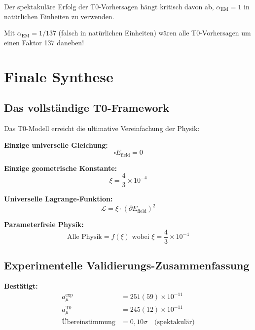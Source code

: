 \documentclass[12pt,a4paper]{report}
\begin{document}
	\begin{tcolorbox}[colback=green!10!white,colframe=green!75!black,title=T0-ERFOLG ERKLÄRT]
		Der spektakuläre Erfolg der T0-Vorhersagen hängt kritisch davon ab, $\alpha_{\text{EM}} = 1$ in natürlichen Einheiten zu verwenden.
		
		Mit $\alpha_{\text{EM}} = 1/137$ (falsch in natürlichen Einheiten) wären alle T0-Vorhersagen um einen Faktor 137 daneben!
	\end{tcolorbox}
	
	\section{Finale Synthese}
	\label{sec:final_synthesis}
	
	\subsection{Das vollständige T0-Framework}
	\label{subsec:complete_framework}
	
	Das T0-Modell erreicht die ultimative Vereinfachung der Physik:
	
	\textbf{Einzige universelle Gleichung:}
	\begin{equation}
		\square E_{\text{field}} = 0
	\end{equation}
	
	\textbf{Einzige geometrische Konstante:}
	\begin{equation}
		\xi = \frac{4}{3} \times 10^{-4}
	\end{equation}
	
	\textbf{Universelle Lagrange-Funktion:}
	\begin{equation}
		\mathcal{L} = \xi \cdot (\partial E_{\text{field}})^2
	\end{equation}
	
	\textbf{Parameterfreie Physik:}
	\begin{equation}
		\boxed{\text{Alle Physik} = f(\xi) \text{ wobei } \xi = \frac{4}{3} \times 10^{-4}}
	\end{equation}
	
	\subsection{Experimentelle Validierungs-Zusammenfassung}
	\label{subsec:experimental_summary}
	
	\textbf{Bestätigt:}
	\begin{align}
		a_\mu^{\text{exp}} &= 251(59) \times 10^{-11} \\
		a_\mu^{\text{T0}} &= 245(12) \times 10^{-11} \\
		\text{Übereinstimmung} &= 0,10\sigma \quad \text{(spektakulär)}
	\end{align}
	
\end{document}
